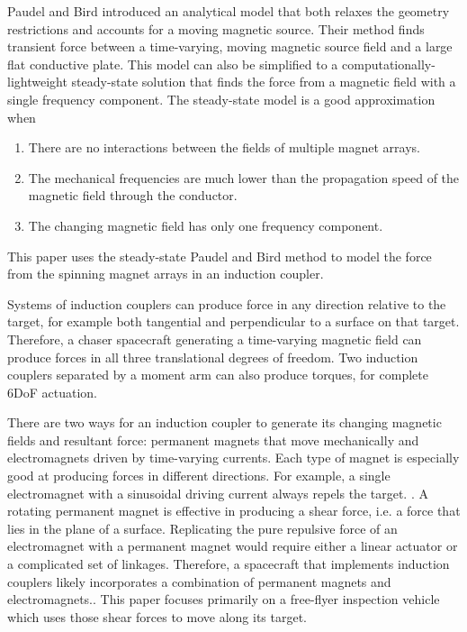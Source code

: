 Paudel and Bird introduced an analytical model that both relaxes the geometry restrictions and accounts for a moving magnetic source. Their method finds transient force between a time-varying, moving magnetic source field and a large flat conductive plate. \cite{Paudel2012t}
This model can also be simplified to a computationally-lightweight steady-state solution that finds the force from a magnetic field with a single frequency component. \cite{Paudel2012ss}
The steady-state model is a good approximation when 
\begin{enumerate}
\item There are no interactions between the fields of multiple magnet arrays. 
\item The mechanical frequencies are much lower than the propagation speed of the magnetic field through the conductor.
\item The changing magnetic field has only one frequency component.
\end{enumerate}
This paper uses the steady-state Paudel and Bird method to model the force from the spinning magnet arrays in an induction coupler. 
 
Systems of induction couplers can produce force in any direction relative to the target, for example both tangential and perpendicular to a surface on that target. Therefore, a chaser spacecraft generating a time-varying magnetic field can produce forces in all three translational degrees of freedom. Two induction couplers separated by a moment arm can also produce torques, for complete 6DoF actuation.

There are two ways for an induction coupler to generate its changing magnetic fields and resultant force: permanent magnets that move mechanically and electromagnets driven by time-varying currents. Each type of magnet is especially good at producing forces in different directions. For example, a single electromagnet with a sinusoidal driving current always repels the target. \cite{Reinhardt2012}.  A rotating permanent magnet is effective in producing a shear force, i.e. a force that lies in the plane of a surface.  Replicating the pure repulsive force of an electromagnet with a permanent magnet would require either a linear actuator or a complicated set of linkages. Therefore, a spacecraft that implements induction couplers likely incorporates a combination of permanent magnets and electromagnets..  This paper focuses primarily on a free-flyer inspection vehicle which uses those shear forces to move along its target. 